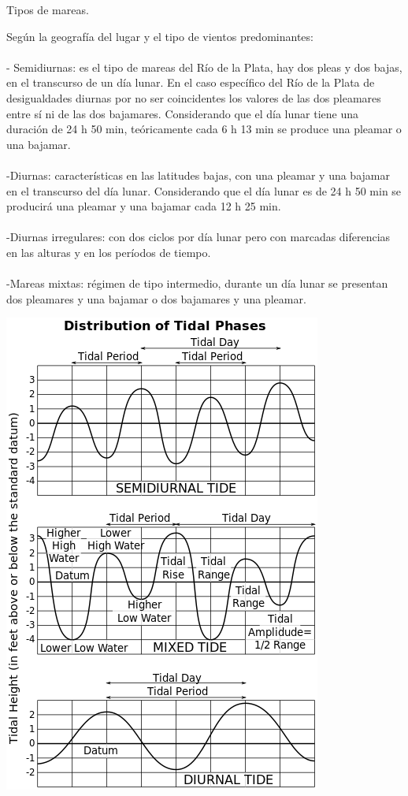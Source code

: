 \documentclass[12pt]{article}
\begin{document}
\begin{center}
\begin{LARGE}
Tipos de mareas.
\end{LARGE}
\end{center}
\begin{large}
Según la geografía del lugar y el tipo de vientos predominantes:\\
\\- Semidiurnas: es el tipo de mareas del Río de la Plata, hay dos pleas y dos bajas, en el transcurso de un día lunar. En el caso específico del Río de la Plata de desigualdades diurnas por no ser coincidentes los valores de las dos pleamares entre sí ni de las dos bajamares. Considerando que el día lunar tiene una duración de 24 h 50 min, teóricamente cada 6 h 13 min se produce una pleamar o una bajamar.\\
\\-Diurnas: características en las latitudes bajas, con una pleamar y una bajamar en el transcurso del día lunar. Considerando que el día lunar es de 24 h 50 min se producirá una pleamar y una bajamar cada 12 h 25 min.\\
\\-Diurnas irregulares: con dos ciclos por día lunar pero con marcadas diferencias en las alturas y en los períodos de tiempo.\\
\\-Mareas mixtas: régimen de tipo intermedio, durante un día lunar se presentan dos pleamares y una bajamar o dos bajamares y una pleamar.

\end{large}
\begin{center}
\includegraphics[scale=0.6]{Tide_type.png}  
\end{center}
\end{document}
